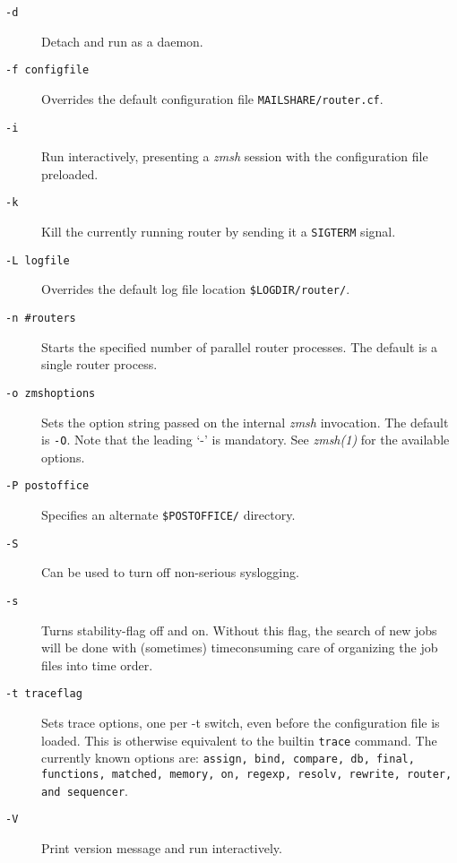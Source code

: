 \begin{description}
\item[{\tt -d}] \mbox{}

Detach and run as a daemon. 

\item[{\tt -f configfile}] \mbox{}

Overrides the default configuration 
file {\tt MAILSHARE/router.cf}. 

\item[{\tt -i}] \mbox{}

Run interactively, presenting a {\em zmsh}  
session with the configuration file preloaded. 

\item[{\tt -k}] \mbox{}

Kill the currently running router by 
sending it a {\tt SIGTERM} signal. 

\item[{\tt -L logfile}] \mbox{}

Overrides the default   log file location 
{\tt \$LOGDIR/router/}. 

\item[{\tt -n \#routers}] \mbox{}

Starts the specified number of 
parallel router processes. The default is a single router process. 

\item[{\tt -o zmshoptions}] \mbox{}

Sets the option string passed on the 
internal {\em zmsh} invocation. The default is {\tt -O}. 
Note that the leading `-' is mandatory. See {\em zmsh(1)} 
for the available options. 

\item[{\tt -P postoffice}] \mbox{}

Specifies an alternate 
{\tt \$POSTOFFICE/} directory. 

\item[{\tt -S}] \mbox{}

Can be used to turn off non-serious syslogging. 

\item[{\tt -s}] \mbox{}

Turns stability-flag off and on. Without this
flag, the search of new jobs will be done with (sometimes) 
timeconsuming care of organizing the job files into time order. 

\item[{\tt -t traceflag}] \mbox{}

Sets trace options, one per -t switch, 
even before the configuration file is loaded. This is otherwise 
equivalent to the builtin {\tt trace} command. The currently 
known options are: {\tt assign, bind, compare, db, final, functions, matched, memory, on, regexp, resolv, rewrite, router, and sequencer}. 

\item[{\tt -V}] \mbox{}

Print version message and run interactively. 

\end{description}
 


